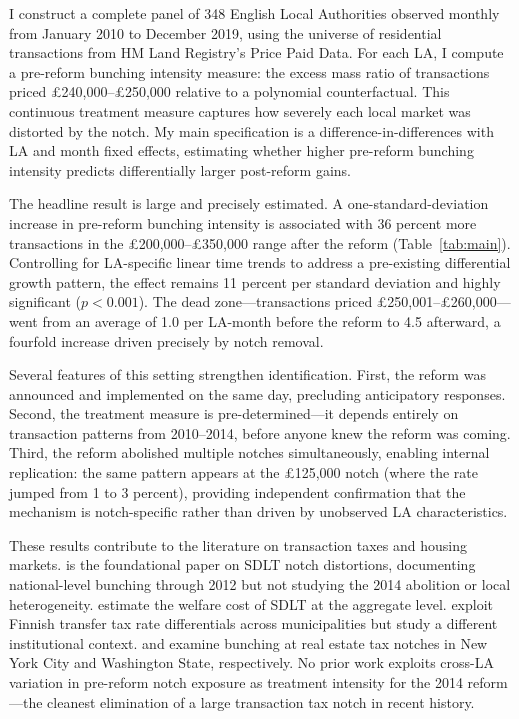 \documentclass[12pt]{article}
\begin{document}
I construct a complete panel of 348 English Local Authorities observed monthly from January 2010 to December 2019, using the universe of residential transactions from HM Land Registry's Price Paid Data. For each LA, I compute a pre-reform bunching intensity measure: the excess mass ratio of transactions priced \pounds240,000--\pounds250,000 relative to a polynomial counterfactual. This continuous treatment measure captures how severely each local market was distorted by the notch. My main specification is a difference-in-differences with LA and month fixed effects, estimating whether higher pre-reform bunching intensity predicts differentially larger post-reform gains.

The headline result is large and precisely estimated. A one-standard-deviation increase in pre-reform bunching intensity is associated with 36 percent more transactions in the \pounds200,000--\pounds350,000 range after the reform (Table~\ref{tab:main}). Controlling for LA-specific linear time trends to address a pre-existing differential growth pattern, the effect remains 11 percent per standard deviation and highly significant ($p < 0.001$). The dead zone---transactions priced \pounds250,001--\pounds260,000---went from an average of 1.0 per LA-month before the reform to 4.5 afterward, a fourfold increase driven precisely by notch removal.

Several features of this setting strengthen identification. First, the reform was announced and implemented on the same day, precluding anticipatory responses. Second, the treatment measure is pre-determined---it depends entirely on transaction patterns from 2010--2014, before anyone knew the reform was coming. Third, the reform abolished multiple notches simultaneously, enabling internal replication: the same pattern appears at the \pounds125,000 notch (where the rate jumped from 1 to 3 percent), providing independent confirmation that the mechanism is notch-specific rather than driven by unobserved LA characteristics.

These results contribute to the literature on transaction taxes and housing markets. \citet{best_kleven2018} is the foundational paper on SDLT notch distortions, documenting national-level bunching through 2012 but not studying the 2014 abolition or local heterogeneity. \citet{besley_meads_surico2014} estimate the welfare cost of SDLT at the aggregate level. \citet{hilber_lyytikainen2017} exploit Finnish transfer tax rate differentials across municipalities but study a different institutional context. \citet{kopczuk_munroe2015} and \citet{slemrod2010} examine bunching at real estate tax notches in New York City and Washington State, respectively. No prior work exploits cross-LA variation in pre-reform notch exposure as treatment intensity for the 2014 reform---the cleanest elimination of a large transaction tax notch in recent history.
\end{document}
